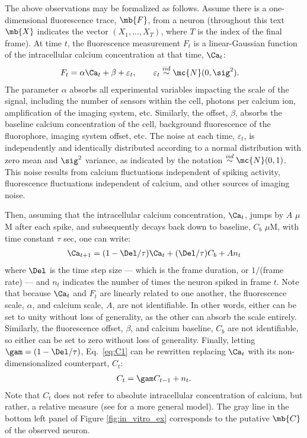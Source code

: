 The above observations may be formalized as follows. Assume there is a one-dimensional fluorescence trace, $\mb{F}$, from a neuron (throughout this text $\mb{X}$ indicates the vector $(X_1, \ldots, X_T)$, where $T$ is the index of the final frame).  At time $t$, the fluorescence measurement $F_t$ is a linear-Gaussian function of the intracellular calcium concentration at that time, $\Ca_t$:
\begin{align} \label{eq:F}
F_t &= \alpha \Ca_t + \beta + \varepsilon_t, \qquad \varepsilon_t \overset{iid}{\sim} \mc{N}(0,\sig^2).
\end{align}
\noindent The parameter $\alpha$ absorbs all experimental variables impacting the scale of the signal, including the number of sensors within the cell, photons per calcium ion, amplification of the imaging system, etc.  Similarly, the offset, $\beta$, absorbs the baseline calcium concentration of the cell, background fluorescence of the fluorophore, imaging system offset, etc.   The noise at each time, $\varepsilon_t$, is independently and identically distributed according to a normal distribution with zero mean and $\sig^2$ variance, as indicated by the notation $\overset{iid}{\sim}\mc{N}(0,1)$.  This noise results from calcium fluctuations independent of spiking activity, fluorescence fluctuations independent of calcium, and other sources of imaging noise.

Then, assuming that the intracellular calcium concentration, $\Ca_t$, jumps by $A$ $\mu$M after each spike, and subsequently decays back down to baseline, $C_b$ $\mu$M, with time constant $\tau$ sec, one can write:
\begin{align} \label{eq:C1}
\Ca_{t+1} = (1- \Del/\tau ) \Ca_t + (\Del/\tau) C_b + A n_t
\end{align}
\noindent where $\Del$ is the time step size --- which is the frame duration, or $1/$(frame rate) --- and $n_t$ indicates the number of times the neuron spiked in frame $t$. %
Note that because $\Ca_t$ and $F_t$ are linearly related to one another, the fluorescence scale, $\alpha$, and calcium scale, $A$, are not identifiable.  In other words, either can be set to unity without loss of generality, as the other can absorb the scale entirely. Similarly, the fluorescence offset, $\beta$, and calcium baseline, $C_b$ are not identifiable, so either can be set to zero without loss of generality.  Finally, letting $\gam=(1-\Del/\tau)$, Eq.~\eqref{eq:C1} can be rewritten replacing $\Ca_t$ with its non-dimensionalized counterpart, $C_t$: 
\begin{align} \label{eq:C2}
	 C_t =\gam C_{t-1} + n_t.
\end{align} 
\noindent Note that $C_t$ does not refer to absolute intracellular concentration of calcium, but rather, a relative measure (see \cite{VogelsteinPaninski09} for a more general model).  The gray line in the bottom left panel of Figure \ref{fig:in_vitro_ex} corresponds to the putative $\mb{C}$ of the observed neuron.  

